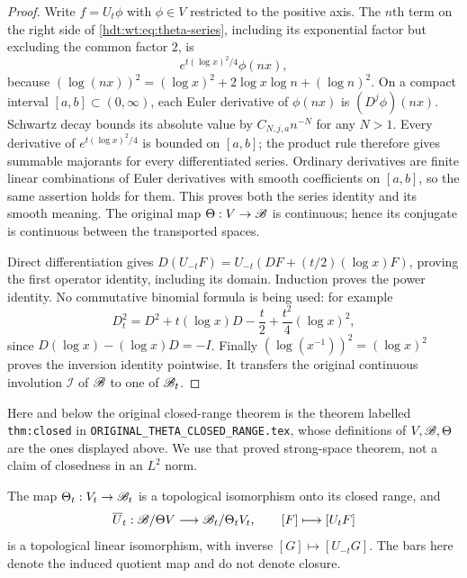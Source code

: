 \documentclass[11pt]{article}
\begin{document}
\begin{proof}
Write $f=U_t\phi$ with $\phi\in V$ restricted to the positive
axis.  The $n$th term on the right side of
\eqref{hdt:wt:eq:theta-series}, including its exponential factor but
excluding the common factor $2$, is
\[
 e^{t(\log x)^2/4}\phi(nx),
\]
because
$(\log(nx))^2=(\log x)^2+2\log x\log n+(\log n)^2$.
On a compact interval $[a,b]\subset(0,\infty)$, each Euler
derivative of $\phi(nx)$ is $(D^j\phi)(nx)$.  Schwartz decay
bounds its absolute value by $C_{N,j,a}n^{-N}$ for any $N>1$.
Every derivative of $e^{t(\log x)^2/4}$ is bounded on $[a,b]$;
the product rule therefore gives summable majorants for every
differentiated series.  Ordinary derivatives are finite linear
combinations of Euler derivatives with smooth coefficients on
$[a,b]$, so the same assertion holds for them.  This proves both
the series identity and its smooth meaning.  The original map
$\Theta:V\to\mathscr B$ is continuous; hence its conjugate is continuous
between the transported spaces.

Direct differentiation gives
$D(U_{-t}F)=U_{-t}(DF+(t/2)(\log x)F)$, proving the first
operator identity, including its domain.  Induction proves the
power identity.  No commutative binomial formula is being used:
for example
\[
 D_t^2=D^2+t(\log x)D-\frac t2+\frac{t^2}{4}(\log x)^2,
\]
since $D(\log x)- (\log x)D=-I$.  Finally
$(\log(x^{-1}))^2=(\log x)^2$ proves the inversion identity
pointwise.  It transfers the original continuous involution
$\mathcal I$ of $\mathscr B$ to one of $\mathscr B_t$.
\end{proof}

Here and below the original closed-range theorem is the theorem
labelled \texttt{thm:closed} in
\texttt{ORIGINAL\_THETA\_CLOSED\_RANGE.tex}, whose definitions
of $V,\mathscr B,\Theta$ are the ones displayed above.  We use that proved
strong-space theorem, not a claim of closedness in an $L^2$ norm.

\begin{hdtcorollary}
\label{hdt:wt:cor:quotient}
The map $\Theta_t:V_t\to\mathscr B_t$ is a topological isomorphism
onto its closed range, and
\begin{equation}\label{hdt:wt:eq:strong-quotient}
 \overline U_t:\mathscr B/\Theta V\longrightarrow\mathscr B_t/\Theta_tV_t,
 \qquad [F]\longmapsto[U_tF]
\end{equation}
is a topological linear isomorphism, with inverse
$[G]\mapsto[U_{-t}G]$.  The bars here denote the induced quotient
map and do not denote closure.
\end{hdtcorollary}
\end{document}
